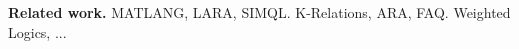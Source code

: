 %
%


\medskip
\noindent
\textbf{Related work.} 
 MATLANG, LARA, SIMQL.
K-Relations, ARA, FAQ.
 Weighted Logics, ...

